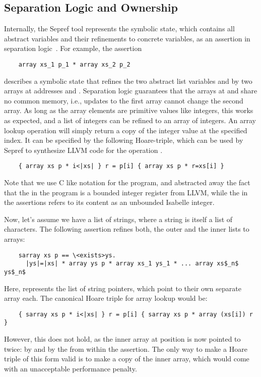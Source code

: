 \documentclass[sigplan,10pt,anonymous,review]{acmart}\settopmatter{printfolios=true,printccs=false,printacmref=false}
\theoremstyle{definition}
\begin{document}
  \subsection{Separation Logic and Ownership}
  Internally, the Sepref tool represents the symbolic state, which contains all abstract variables and their refinements to concrete variables,
  as an assertion in separation logic~\cite{Rey02,CHY07}. For example, the assertion
  \begin{lstlisting}
    array xs_1 p_1 * array xs_2 p_2
  \end{lstlisting}
  describes a symbolic state that refines the two abstract list variables  and  by
  two arrays at addresses  and . Separation logic guarantees that the arrays at  and 
  share no common memory, i.e.,
  updates to the first array cannot change the second array. As long as the array elements are
  primitive values like integers, this works as expected, and a list of integers can be refined
  to an array of integers. An array lookup operation will simply return a copy of the integer
  value at the specified index. It can be specified by the following Hoare-triple, which can
  be used by Sepref to synthesize LLVM code for the operation .
  \begin{lstlisting}
    { array xs p * i<|xs| } r = p[i] { array xs p * r=xs[i] }
  \end{lstlisting}
  Note that we use C like notation for the program, and abstracted away the fact that the 
  in the program is a bounded integer register from LLVM, while the  in the assertions refers to
  its content as an unbounded Isabelle integer.

  Now, let's assume we have a list of strings, where a string is itself a list of characters.
  The following assertion refines both, the outer and the inner lists to arrays:
  \begin{lstlisting}
    sarray xs p == \<exists>ys.
      |ys|=|xs| * array ys p * array xs_1 ys_1 * ... array xs$_n$ ys$_n$
  \end{lstlisting}
  Here,  represents the list of string pointers, which point to their own separate array each.
  The canonical Hoare triple for array lookup would be:
  \begin{lstlisting}
    { sarray xs p * i<|xs| } r = p[i] { sarray xs p * array (xs[i]) r }
  \end{lstlisting}
  However, this does not hold, as the inner array at position  is now pointed to twice:
  by  and by the  from within the  assertion. The only way to make a
  Hoare triple of this form valid is to make a copy of the inner array, which would come with an
  unacceptable performance penalty.
\end{document}
